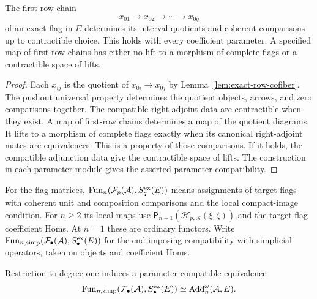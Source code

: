 \begin{lemma}\label{lem:flag-first-row}
The first-row chain
\[
 x_{01}\longrightarrow x_{02}\longrightarrow\cdots
       \longrightarrow x_{0q}
\]
of an exact flag in $E$ determines its interval
quotients and coherent comparisons up to contractible choice. This
holds with every coefficient parameter. A specified map of first-row
chains has either no lift to a morphism of complete flags or a
contractible space of lifts.
\end{lemma}

\begin{proof}
Each $x_{ij}$ is the quotient of $x_{0i}\to x_{0j}$ by
Lemma~\ref{lem:exact-row-cofiber}. The pushout universal property
determines the quotient objects, arrows, and zero comparisons
together. The compatible right-adjoint data are contractible when
they exist.
A map of first-row chains determines a map of the quotient diagrams.
It lifts to a morphism of complete flags exactly when its canonical
right-adjoint mates are equivalences. This is a property of those
comparisons. If it holds, the compatible adjunction data give the
contractible space of lifts. The construction in each parameter
module gives the asserted parameter compatibility.
\end{proof}


For the flag matrices, $\operatorname{Fun}_n
(\mathcal F_p(\mathcal A),S_q^{\mathrm{ex}}(E))$ means assignments of target
flags with coherent unit and composition comparisons and the local
compact-image condition. For $n\geq2$ its local maps use
$\mathsf P_{n-1}(\mathcal H_{p,\mathcal A}(\xi,\zeta))$ and the
target flag coefficient Homs. At $n=1$ these are ordinary functors.
Write
$\operatorname{Fun}_{n,\mathrm{simp}}
(\mathcal F_\bullet(\mathcal A),S_\bullet^{\mathrm{ex}}(E))$
for the end imposing compatibility with simplicial operators,
taken on objects and coefficient Homs.

\begin{theorem}\label{thm:flag-recognition}
Restriction to degree one induces a parameter-compatible equivalence
\begin{equation}\label{eq:flag-recognition}
 \operatorname{Fun}_{n,\mathrm{simp}}
    (\mathcal F_\bullet(\mathcal A),S_\bullet^{\mathrm{ex}}(E))
       \simeq\operatorname{Add}_n^\omega(\mathcal A,E).
\end{equation}
\end{theorem}


